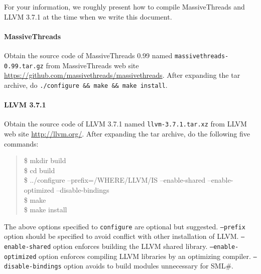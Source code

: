 \documentclass{jbook}
\newcommand{\smlsharp}{SML\#}
\newenvironment{program}{\begin{quote}\begin{tt}}%
                        {\end{tt}\end{quote}}
\begin{document}
	For your information, we roughly present how to compile MassiveThreads
and LLVM 3.7.1 at the time when we write this document.

\paragraph{MassiveThreads}
	Obtain the source code of MassiveThreads 0.99 named
{\tt massivethreads-0.99.tar.gz} from
MassiveThreads web site
\url{https://github.com/massivethreads/massivethreads}.
	After expanding the tar archive,
do {\tt ./configure \&\& make \&\& make install}.

\paragraph{LLVM 3.7.1}
	Obtain the source code of LLVM 3.7.1 named
{\tt llvm-3.7.1.tar.xz}
from LLVM web site \url{http://llvm.org/}.
	After expanding the tar archive,
do the following five commands:
\begin{program}
\$ mkdir build\\
\$ cd build\\
\$ ../configure --prefix=/WHERE/LLVM/IS --enable-shared --enable-optimized --disable-bindings\\
\$ make\\
\$ make install
\end{program}
	The above options specified to {\tt configure} are optional but suggested.
	{\tt --prefix} option should be specified to avoid conflict with
other installation of LLVM.
	{\tt --enable-shared} option enforces building the LLVM shared library.
	{\tt --enable-optimized} option enforces compiling LLVM libraries by
an optimizing compiler.
	{\tt --disable-bindings} option avoids to build modules unnecessary
for \smlsharp{}.
\end{document}
